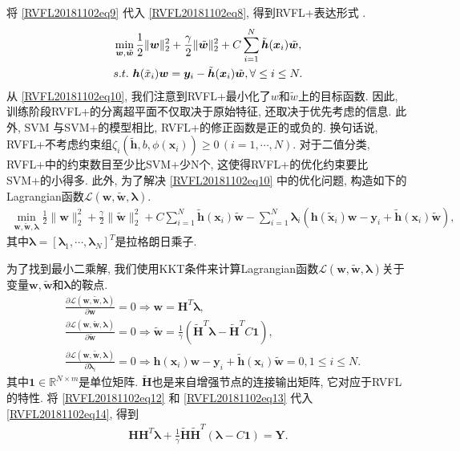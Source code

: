 将 \eqref{RVFL20181102eq9} 代入 \eqref{RVFL20181102eq8}, 得到RVFL+表达形式 \cite{Saunders1998}.
\begin{align}
    &\min\limits_{{\bm w},\tilde {\bm w}} \frac 1 2\|{\bm w}\|_2^ 2 + \frac \gamma 2 \|\tilde {\bm w}\|_2^ 2 + C\sum_{i=1}^N  {\tilde {\bm h}}({\bm x}_i)\tilde {\bm w},\notag\\
    &s.t.\,\,\bm h(\tilde x_i){\bm w} =\bm y_i - {\tilde {\bm h}}({\bm x}_i)\tilde {\bm w}, \forall \leq i \leq  N.
    \label{RVFL20181102eq10}
\end{align}
从 \eqref{RVFL20181102eq10}, 我们注意到RVFL+最小化了$w$和$\tilde w$上的目标函数. 因此, 训练阶段RVFL+的分离超平面不仅取决于原始特征, 还取决于优先考虑的信息.
此外, SVM \cite{Cortes1995Support}与SVM+的模型相比, RVFL+的修正函数是正的或负的.
换句话说, RVFL+不考虑约束组$\zeta_i(\tilde{\bm h}, b, \phi({\bm x}_i))\geq 0\,(i=1, \cdots, N)$.
对于二值分类, RVFL+中的约束数目至少比SVM+少N个, 这使得RVFL+的优化约束要比SVM+的小得多.
此外, 为了解决 \eqref{RVFL20181102eq10} 中的优化问题, 构造如下的Lagrangian函数$\mathscr L(\bm w, \tilde{\bm w}, \bm\lambda)$.
\begin{align}
    \min\limits_{\bm w, \tilde{\bm w},\bm \lambda} \frac 1 2\|{\bm w}\|_2^ 2 + \frac \gamma 2 \|\tilde {\bm w}\|_2^ 2 + C\sum_{i=1}^N  {\tilde {\bm h}}({\bm x}_i)\tilde {\bm w}-\sum_{i=1}^N  \bm \lambda_i(\bm h(\tilde {\bm x}_i){\bm w} -\bm y_i +{\tilde {\bm h}}({\bm x}_i)\tilde {\bm w}),
\end{align}
其中$\bm\lambda=[\bm\lambda_1, \cdots, \bm\lambda_N]^T$是拉格朗日乘子.

为了找到最小二乘解, 我们使用KKT条件来计算Lagrangian函数$\mathscr L(\bm w, \tilde{\bm w},\bm\lambda)$关于变量$\bm w,\tilde{\bm w}$和$\bm\lambda$的鞍点.
\begin{align}
 &\frac {\partial \mathscr L (\bm w, \tilde{\bm w},\bm \lambda)}{\partial \bm w}= 0 \Rightarrow  \bm w = \bm  H^T \bm \lambda, \label{RVFL20181102eq12}\\
 &\frac {\partial \mathscr L (\bm w, \tilde{\bm w},\bm \lambda)}{\partial \tilde{\bm w}} = 0 \Rightarrow  \tilde{\bm w} = \frac 1  \gamma  (\tilde{\bm  H}^T  \bm \lambda - \tilde{\bm  H}^T C \bm 1), \label{RVFL20181102eq13}\\
 &\frac {\partial \mathscr L (\bm w, \tilde{\bm w},\bm \lambda)}{\partial \bm \lambda_i} = 0 \Rightarrow  \bm h(\bm x_i)\bm w - \bm y_i + \tilde {\bm h}({\bm x}_i) \tilde{\bm w} = 0, 1 \leq  i \leq  N.\label{RVFL20181102eq14}
\end{align}
其中$\bm 1\in\mathbb R^{N\times m}$是单位矩阵. $\tilde{\bm H}$也是来自增强节点的连接输出矩阵, 它对应于RVFL的特性.
将 \eqref{RVFL20181102eq12} 和 \eqref{RVFL20181102eq13} 代入 \eqref{RVFL20181102eq14}, 得到
\begin{align}
    \bm H \bm H^T  \bm \lambda + \frac 1 \gamma\tilde{\bm H} \tilde{\bm H}^T  (\bm \lambda -C \bm 1) = \bm Y. \label{RVFL20181102eq15}
\end{align}

